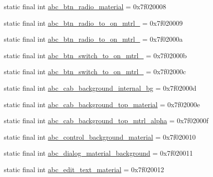 \begin{CompactItemize}
\item 
static final int \hyperlink{classandroid_1_1support_1_1graphics_1_1drawable_1_1_r_1_1drawable_750d37862b5460eb4923e9850aaa2cf3}{abc\_\-btn\_\-radio\_\-material} = 0x7f020008
\item 
static final int \hyperlink{classandroid_1_1support_1_1graphics_1_1drawable_1_1_r_1_1drawable_e0788e7b89d8eb92701e8b45e01bbf09}{abc\_\-btn\_\-radio\_\-to\_\-on\_\-mtrl\_} = 0x7f020009
\item 
static final int \hyperlink{classandroid_1_1support_1_1graphics_1_1drawable_1_1_r_1_1drawable_fc01183f88e2cba59c8c358d0a022f59}{abc\_\-btn\_\-radio\_\-to\_\-on\_\-mtrl\_} = 0x7f02000a
\item 
static final int \hyperlink{classandroid_1_1support_1_1graphics_1_1drawable_1_1_r_1_1drawable_09b056f025cacb6f16fea19c187b46a9}{abc\_\-btn\_\-switch\_\-to\_\-on\_\-mtrl\_} = 0x7f02000b
\item 
static final int \hyperlink{classandroid_1_1support_1_1graphics_1_1drawable_1_1_r_1_1drawable_3453813e8144262fad41143b29910dcb}{abc\_\-btn\_\-switch\_\-to\_\-on\_\-mtrl\_} = 0x7f02000c
\item 
static final int \hyperlink{classandroid_1_1support_1_1graphics_1_1drawable_1_1_r_1_1drawable_177476a622768f45dcadc73077feda75}{abc\_\-cab\_\-background\_\-internal\_\-bg} = 0x7f02000d
\item 
static final int \hyperlink{classandroid_1_1support_1_1graphics_1_1drawable_1_1_r_1_1drawable_22dedb1e7c0fd1cfb0faa95be269c785}{abc\_\-cab\_\-background\_\-top\_\-material} = 0x7f02000e
\item 
static final int \hyperlink{classandroid_1_1support_1_1graphics_1_1drawable_1_1_r_1_1drawable_02f687790ec068285ac5ab9765c8dfe1}{abc\_\-cab\_\-background\_\-top\_\-mtrl\_\-alpha} = 0x7f02000f
\item 
static final int \hyperlink{classandroid_1_1support_1_1graphics_1_1drawable_1_1_r_1_1drawable_57ac26de62b22344fc75123aabcff01b}{abc\_\-control\_\-background\_\-material} = 0x7f020010
\item 
static final int \hyperlink{classandroid_1_1support_1_1graphics_1_1drawable_1_1_r_1_1drawable_f0ca08099d1c2ffc831992998475af1f}{abc\_\-dialog\_\-material\_\-background} = 0x7f020011
\item 
static final int \hyperlink{classandroid_1_1support_1_1graphics_1_1drawable_1_1_r_1_1drawable_eab9662aec3747ef99de09c8bf598f03}{abc\_\-edit\_\-text\_\-material} = 0x7f020012
\item 

\end{CompactItemize}
